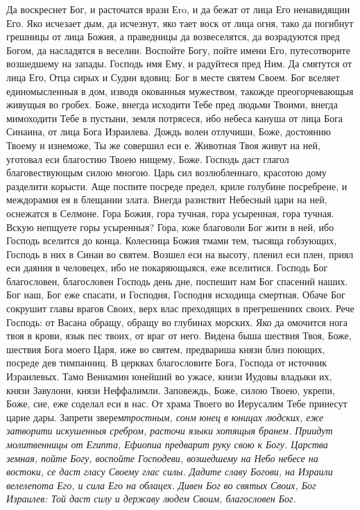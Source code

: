 Да воскреснет Бог, и расточатся врази Еro, и да бежат от лица Его ненавидящии Его. Яко исчезает дым, да исчезнут, яко тает воск от лица огня, тако да погибнут грешницы от лица Божия, а праведницы да возвеселятся, да возрадуются пред Богом, да насладятся в веселии. Воспойте Богу, пойте имени Его, путесотворите возшедшему на запады. Господь имя Ему, и радуйтеся пред Ним. Да смятутся от лица Его, Отца сирых и Судии вдовиц: Бог в месте святем Своем. Бог вселяет единомысленныя в дом, изводя окованныя мужеством, такожде преогорчевающыя живущыя во гробех. Боже, внегда исходити Тебе пред людьми Твоими, внегда мимоходити Тебе в пустыни, земля потрясеся, ибо небеса кануша от лица Бога Синаина, от лица Бога Израилева. Дождь волен отлучиши, Боже, достоянию Твоему и изнеможе, Ты же совершил еси е. Животная Твоя живут на ней, уготовал еси благостию Твоею нищему, Боже. Господь даст глагол благовествующым силою многою. Царь сил возлюбленнаго, красотою дому разделити корысти. Аще поспите посреде предел, криле голубине посребрене, и междорамия ея в блещании злата. Внегда разнствит Небесный цари на ней, оснежатся в Селмоне. Гора Божия, гора тучная, гора усыренная, гора тучная. Вскую непщуете горы усыренныя? Гора, юже благоволи Бог жити в ней, ибо Господь вселится до конца. Колесница Божия тмами тем, тысяща гобзующих, Господь в них в Синаи во святем. Возшел еси на высоту, пленил еси плен, приял еси даяния в человецех, ибо не покаряющыяся, еже вселитися. Господь Бог благословен, благословен Господь день дне, поспешит нам Бог спасений наших. Бог наш, Бог еже спасати, и Господня, Господня исходища смертная. Обаче Бог сокрушит главы врагов Своих, верх влас преходящих в прегрешениих своих. Рече Господь: от Васана обращу, обращу во глубинах морских. Яко да омочится нога твоя в крови, язык пес твоих, от враг от него. Видена быша шествия Твоя, Боже, шествия Бога моего Царя, иже во святем, предвариша князи близ поющих, посреде дев тимпанниц. В церквах благословите Бога, Господа от источник Израилевых. Тамо Вениамин юнейший во ужасе, книзи Иудовы владыки их, князи Завулони, князи Неффалимли. Заповеждь, Боже, силою Твоею, укрепи, Боже, сие, еже соделал еси в нас. От храма Твоего во Иерусалим Тебе принесут царие дары. Запрети зверем\itshape  \normalfont{}тростным, сонм юнец в юницах людских, еже затворити искушенныя сребром, расточи языки хотящыя бранем. Приидут молитвенницы от Египта, Ефиопиа предварит руку свою к Богу. Царства земная, пойте Богу, воспойте Господеви, возшедшему на Небо небесе на востоки, се даст гласу Своему глас силы. Дадите славу Богови, на Израили велелепота Его, и сила Его на облацех. Дивен Бог во святых Своих, Бог Израилев: Той даст силу и державу людем Своим, благословен Бог.


